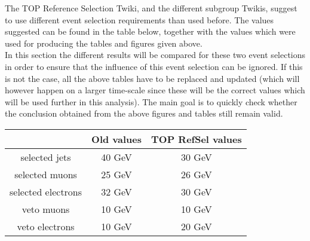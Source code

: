 The TOP Reference Selection Twiki, and the different subgroup Twikis, suggest to use different event selection requirements than used before. The values suggested can be found in the table below, together with the values which were used for producing the tables and figures given above.\\
In this section the different results will be compared for these two event selections in order to ensure that the influence of this event selection can be ignored. If this is not the case, all the above tables have to be replaced and updated (which will however happen on a larger time-scale since these will be the correct values which will be used further in this analysis). The main goal is to quickly check whether the conclusion obtained from the above figures and tables still remain valid.
\begin{table}[!h]
 \centering
 \begin{tabular}{c|c|c}
                      & Old values & TOP RefSel values \\
   \hline
   selected jets      &   40 GeV   &       30 GeV      \\
   selected muons     &   25 GeV   &       26 GeV      \\
   selected electrons &   32 GeV   &       30 GeV      \\
   veto muons         &   10 GeV   &       10 GeV      \\
   veto electrons     &   10 GeV   &       20 GeV      
 \end{tabular}
\end{table}

